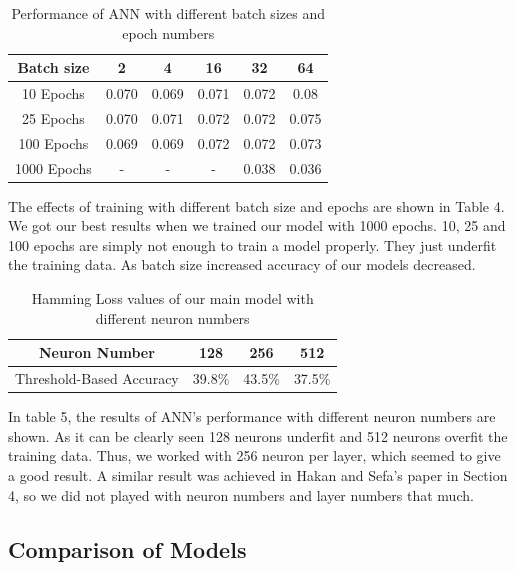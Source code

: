 \documentclass[10pt,twocolumn,letterpaper]{article}
\begin{document}
\begin{table}[H]
\begin{center}
\begin{tabular}{|c|c|c|c|c|c|}
\hline
Batch size & 2 & 4 & 16 & 32 & 64\\
\hline
10 Epochs & 0.070 & 0.069 & 0.071 & 0.072 & 0.08\\
25 Epochs & 0.070 & 0.071 & 0.072 & 0.072 & 0.075\\
100 Epochs & 0.069 & 0.069 & 0.072 & 0.072 & 0.073\\
1000 Epochs & - & - & - & 0.038 & 0.036\\
\hline
\end{tabular}
\end{center}
\caption{Performance of ANN with different batch sizes and epoch numbers}
\end{table}

The effects of training with different batch size and epochs are shown in Table 4. We got our best results when we trained our model with 1000 epochs. 10, 25 and 100 epochs are simply not enough to train a model properly. They just underfit the training data. As batch size increased accuracy of our models decreased.

\begin{table}[H]
\begin{center}
\begin{tabular}{|c|c|c|c|}
\hline
Neuron Number & 128 & 256 & 512\\
\hline
Threshold-Based Accuracy & 39.8\% & 43.5\% & 37.5\%\\
\hline
\end{tabular}
\end{center}
\caption{Hamming Loss values of our main model with different neuron numbers}
\end{table}

In table 5, the results of ANN's performance with different neuron numbers are shown. As it can be clearly seen 128 neurons underfit and 512 neurons overfit the training data. Thus, we worked with 256 neuron per layer, which seemed to give a good result. A similar result was achieved in Hakan and Sefa's paper\cite{oldpaper} in Section 4, so we did not played with neuron numbers and layer numbers that much.

\subsection{Comparison of Models}
\end{document}
